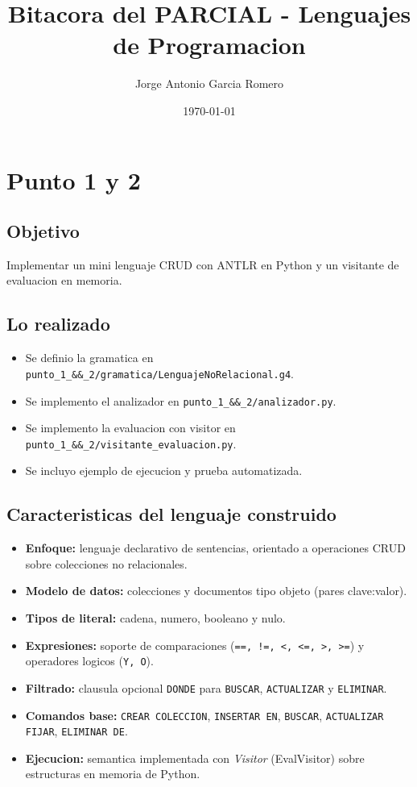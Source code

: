 \documentclass[12pt,a4paper]{article}
\title{Bitacora del PARCIAL - Lenguajes de Programacion}
\author{Jorge Antonio Garcia Romero}
\date{\today}
\begin{document}
\maketitle

\section{Punto 1 y 2}
\subsection*{Objetivo}
Implementar un mini lenguaje CRUD con ANTLR en Python y un visitante de evaluacion en memoria.

\subsection*{Lo realizado}
\begin{itemize}
    \item Se definio la gramatica en \texttt{punto\_1\_\&\&\_2/gramatica/LenguajeNoRelacional.g4}.
    \item Se implemento el analizador en \texttt{punto\_1\_\&\&\_2/analizador.py}.
    \item Se implemento la evaluacion con visitor en \texttt{punto\_1\_\&\&\_2/visitante\_evaluacion.py}.
    \item Se incluyo ejemplo de ejecucion y prueba automatizada.
\end{itemize}

\subsection*{Caracteristicas del lenguaje construido}
\begin{itemize}
    \item \textbf{Enfoque:} lenguaje declarativo de sentencias, orientado a operaciones CRUD sobre colecciones no relacionales.
    \item \textbf{Modelo de datos:} colecciones y documentos tipo objeto (pares clave:valor).
    \item \textbf{Tipos de literal:} cadena, numero, booleano y nulo.
    \item \textbf{Expresiones:} soporte de comparaciones (\texttt{==, !=, <, <=, >, >=}) y operadores logicos (\texttt{Y, O}).
    \item \textbf{Filtrado:} clausula opcional \texttt{DONDE} para \texttt{BUSCAR}, \texttt{ACTUALIZAR} y \texttt{ELIMINAR}.
    \item \textbf{Comandos base:} \texttt{CREAR COLECCION}, \texttt{INSERTAR EN}, \texttt{BUSCAR}, \texttt{ACTUALIZAR FIJAR}, \texttt{ELIMINAR DE}.
    \item \textbf{Ejecucion:} semantica implementada con \textit{Visitor} (EvalVisitor) sobre estructuras en memoria de Python.
\end{itemize}
\end{document}
